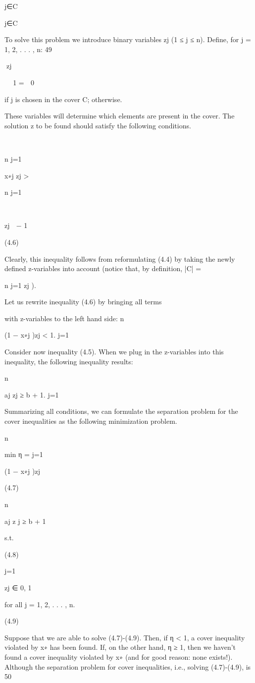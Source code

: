 \documentclass[titlepage]{book}
\theoremstyle{plain}
\theoremstyle{definition}
\theoremstyle{remark}
\begin{document}
j∈C

j∈C

To solve this problem we introduce binary variables zj (1 ≤ j ≤ n). Define, for j = 1, 2, . . . , n:
49

zj


 1
=
 0

if j is chosen in the cover C;
otherwise.

These variables will determine which elements are present in the cover. The solution z to be found should
satisfy the following conditions.



n
j=1

x∗j zj > 

n
j=1



zj  − 1

(4.6)

Clearly, this inequality follows from reformulating (4.4) by taking the newly defined z-variables into
account (notice that, by definition, |C| =

n
j=1 zj ).

Let us rewrite inequality (4.6) by bringing all terms

with z-variables to the left hand side:
n

(1 − x∗j )zj < 1.
j=1

Consider now inequality (4.5). When we plug in the z-variables into this inequality, the following inequality results:

n

aj zj ≥ b + 1.
j=1

Summarizing all conditions, we can formulate the separation problem for the cover inequalities as the
following minimization problem.

n

min η =
j=1

(1 − x∗j )zj

(4.7)

n

aj z j ≥ b + 1

s.t.

(4.8)

j=1

zj ∈ {0, 1}

for all j = 1, 2, . . . , n.

(4.9)

Suppose that we are able to solve (4.7)-(4.9). Then, if η < 1, a cover inequality violated by x∗ has been
found. If, on the other hand, η ≥ 1, then we haven't found a cover inequality violated by x∗ (and for good
reason: none exists!). Although the separation problem for cover inequalities, i.e., solving (4.7)-(4.9), is
50
\end{document}
